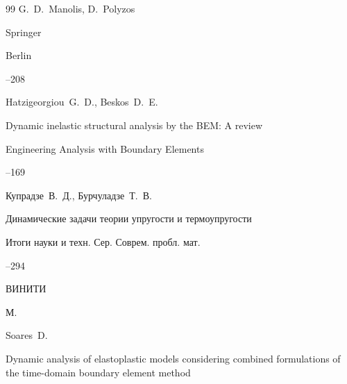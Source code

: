 \begin{thebibliography}{99}
\eds G.~D.~Manolis, D.~Polyzos  

\publ Springer

\publaddr Berlin


--208





\by Hatzigeorgiou~G.~D., Beskos~D.~E.

\paper Dynamic inelastic structural analysis by the BEM: A review

\jour  Engineering Analysis with Boundary Elements




--169





\by Купрадзе~В.~Д., Бурчуладзе~Т.~В.

\paper Динамические задачи теории упругости и термоупругости

\serial Итоги науки и техн. Сер. Соврем. пробл. мат.



--294

\publ ВИНИТИ

\publaddr М.















\by Soares~D.

\paper Dynamic analysis of elastoplastic models considering combined formulations of the time-domain boundary element method


\end{thebibliography}
